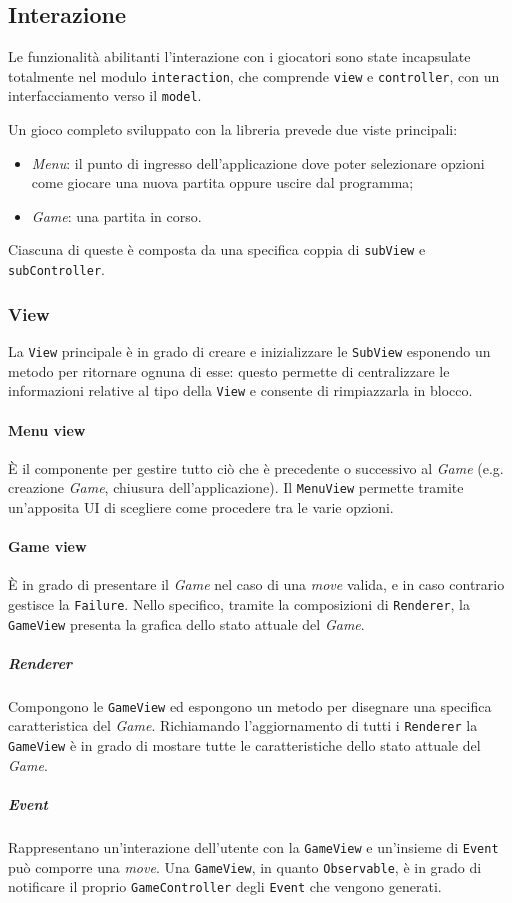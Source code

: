 \subsection{Interazione}

Le funzionalità abilitanti l'interazione con i giocatori sono state incapsulate totalmente nel modulo \texttt{interaction}, che comprende \texttt{view} e \texttt{controller}, con un interfacciamento verso il \texttt{model}.

Un gioco completo sviluppato con la libreria prevede due viste principali:
\begin{itemize}
    \item \textit{Menu}: il punto di ingresso dell'applicazione dove poter selezionare opzioni come giocare una nuova partita oppure uscire dal programma;
    \item \textit{Game}: una partita in corso.
\end{itemize}
%
Ciascuna di queste è composta da una specifica coppia di \texttt{subView} e \texttt{subController}.
%

\subsubsection{View}
La \texttt{View} principale è in grado di creare e inizializzare le \texttt{SubView} esponendo un metodo per ritornare ognuna di esse: questo permette di centralizzare le informazioni relative al tipo della \texttt{View} e consente di rimpiazzarla in blocco. %
\paragraph{Menu view} 
%
È il componente per gestire tutto ciò che è precedente o successivo al \textit{Game} (e.g. creazione \textit{Game}, chiusura dell'applicazione).
%
Il \texttt{MenuView} permette tramite un'apposita UI di scegliere come procedere tra le varie opzioni.
\paragraph{Game view} 
%
È in grado di presentare il \textit{Game} nel caso di una \textit{move} valida, e in caso contrario gestisce la \texttt{Failure}.
%
Nello specifico, tramite la composizioni di \texttt{Renderer}, la \texttt{GameView} presenta la grafica dello stato attuale del \textit{Game}.
\subparagraph{Renderer}
%
Compongono le \texttt{GameView} ed espongono un metodo per disegnare una specifica caratteristica del \textit{Game}.
%
Richiamando l'aggiornamento di tutti i \texttt{Renderer} la \texttt{GameView} è in grado di mostare tutte le caratteristiche dello stato attuale del \textit{Game}.
\subparagraph{Event}
%
Rappresentano un'interazione dell'utente con la \texttt{GameView} e un'insieme di \texttt{Event} può comporre una \textit{move}.
%
Una \texttt{GameView}, in quanto \texttt{Observable}, è in grado di notificare il proprio \texttt{GameController} degli \texttt{Event} che vengono generati. 
